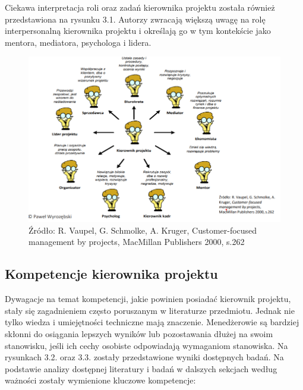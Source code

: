 Ciekawa interpretacja roli oraz zadań kierownika projektu została również przedstawiona na rysunku 3.1. Autorzy zwracają większą uwagę na rolę interpersonalną kierownika projektu i określają go w tym kontekście jako mentora, mediatora, psychologa i lidera.
\begin{figure}
\centering
\includegraphics[width=14cm]{img/rola.png}
\caption{Źródło: R. Vaupel, G. Schmolke, A. Kruger, Customer-focused management by projects, MacMillan Publishers 2000, s.262}
\end{figure}

\subsection{Kompetencje kierownika projektu}
Dywagacje na temat kompetencji, jakie powinien posiadać kierownik projektu, stały się zagadnieniem często poruszanym w literaturze przedmiotu. Jednak nie tylko wiedza i umiejętności techniczne mają znaczenie. Menedżerowie są bardziej skłonni do osiągania lepszych wyników lub pozostawania dłużej na swoim stanowisku, jeśli ich cechy osobiste odpowiadają wymaganiom stanowiska.\autocite{MUMFORD200011}
Na rysunkach 3.2. oraz 3.3. zostały przedstawione wyniki dostępnych badań.
Na podstawie analizy dostępnej literatury i badań w dalszych sekcjach według ważności zostały wymienione kluczowe kompetencje: \autocite{analizaMulti} \autocite{Alvarenga} \autocite{arras2010} \autocite{ziek} \autocite{brill} \autocite{arras2015}

